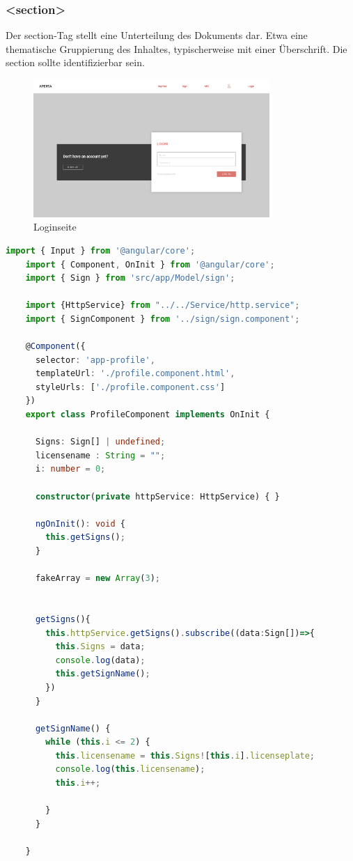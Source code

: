 \subsubsection{<section>}
Der section-Tag stellt eine Unterteilung des Dokuments dar. Etwa eine thematische Gruppierung des Inhaltes, typischerweise mit einer Überschrift. Die section sollte identifizierbar sein. 
\cite{SectionTag}


\begin{figure}[h]
  \centering
  \includegraphics[width=0.8\textwidth]{pics/Loginseite.png}
  \caption{Loginseite}
\end{figure}
\pagebreak

\begin{lstlisting}[language=typeScript, caption=profile.component.ts]
    import { Input } from '@angular/core';
    import { Component, OnInit } from '@angular/core';
    import { Sign } from 'src/app/Model/sign';
    
    import {HttpService} from "../../Service/http.service";
    import { SignComponent } from '../sign/sign.component';
    
    @Component({
      selector: 'app-profile',
      templateUrl: './profile.component.html',
      styleUrls: ['./profile.component.css']
    })
    export class ProfileComponent implements OnInit {
    
      Signs: Sign[] | undefined;
      licensename : String = "";
      i: number = 0;
    
      constructor(private httpService: HttpService) { }
    
      ngOnInit(): void {
        this.getSigns();
      }
    
      fakeArray = new Array(3);
    
    
      getSigns(){
        this.httpService.getSigns().subscribe((data:Sign[])=>{
          this.Signs = data;
          console.log(data);
          this.getSignName();
        })
      }
    
      getSignName() {
        while (this.i <= 2) {
          this.licensename = this.Signs![this.i].licenseplate;
          console.log(this.licensename); 
          this.i++;
    
        }
      }
    
    }    
\end{lstlisting}

